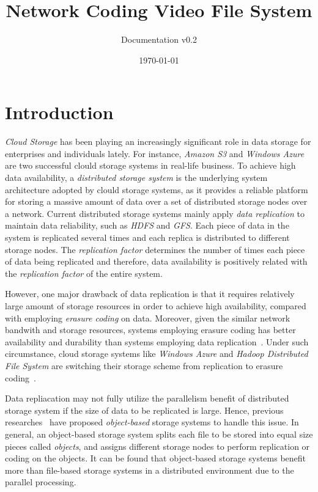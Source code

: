 \documentclass{article}
\title{Network Coding Video File System}
\author{Documentation v0.2}
\date{\today}
\begin{document}
\maketitle

\section{Introduction}
\textit{Cloud Storage} has been playing an increasingly significant
role in data storage for enterprises and individuals lately.
For instance, \textit{Amazon S3} and \textit{Windows Azure} are two successful
clould storage systems in real-life business.
To achieve high data availability, a \textit{distributed storage system} 
is the underlying system architecture adopted by clould storage systems,
as it provides a reliable platform for storing a
massive amount of data over a set of distributed storage nodes over a 
network. Current distributed storage systems mainly apply 
\textit{data replication} to maintain data
reliability, such as \textit{HDFS} and \textit{GFS}. 
Each piece of data in the system is replicated several 
times and each replica is distributed to different storage nodes. 
The \textit{replication factor} determines the number of times each 
piece of data being replicated and therefore, 
data availability is positively related with
the \textit{replication factor} of the entire system. 

However, one major drawback of data replication is that it requires 
relatively large amount of storage resources in order to achieve  
high availability, compared with employing \textit{erasure coding} on
data. 
Moreover, given the similar network bandwith and storage resources, 
systems employing erasure coding has better availability and durability
than systems employing data replication~\cite{Weatherspoon:2002:ECV:646334.687814}.
Under such circumstance, cloud storage systems like \textit{Windows Azure}
and 
\textit{Hadoop Distributed File System} are switching their storage scheme
from replication to erasure coding~\cite{Huang:2012:ECW:2342821.2342823,
hdfs:raid}.

Data repliacation may not fully utilize the parallelism benefit of
distributed storage system if the size of data to be replicated is large. 
Hence, previous researches~\cite{Mesnier03object-basedstorage,Wang04obfs:a} 
have proposed \textit{object-based} storage
systems to handle this issue. In general, an 
object-based storage system splits 
each file to be stored into equal size pieces called \textit{objects}, 
and assigns different storage
nodes to perform replication or coding on the objects. It can
be found that object-based storage systems benefit more than 
file-based storage
systems in a distributed environment due to the parallel processing.
\end{document}
